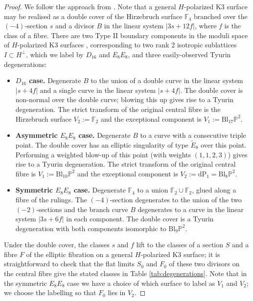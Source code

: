 \documentclass[a4paper]{amsart}
\theoremstyle{definition}
\theoremstyle{plain}
\theoremstyle{remark}
\newcommand{\bF}{\mathbb{F}}
\newcommand{\bP}{\mathbb{P}}
\numberwithin{figure}{section}
\numberwithin{table}{section}
\begin{document}
\begin{proof}
We follow the approach from \cite{t2dk3sd4,jonesthesis}. Note that a general $H$-polarized K3 surface may be realised as a double cover of the Hirzebruch surface $\bF_4$ branched over the $(-4)$-section $s$ and a divisor $B$ in the linear system $|3s + 12f|$, where $f$ is the class of a fibre. There are two Type II boundary components in the moduli space of $H$-polarized K3 surfaces \cite[Section 7F]{cmek3sspt}, corresponding to two rank $2$ isotropic sublattices $I \subset H^{\perp}$, which we label by $D_{16}$ and $E_8E_8$, and three easily-observed Tyurin degenerations:

\begin{itemize}
\item \textbf{$D_{16}$ case.} Degenerate $B$ to the union of a double curve in the linear system $|s+4f|$ and a single curve in the linear system $|s+4f|$. The double cover is non-normal over the double curve; blowing this up gives rise to a Tyurin degeneration. The strict transform of the original central fibre is the Hirzebruch surface $V_2 := \bF_2$ and the exceptional component is $V_1 := \mathrm{Bl}_{17}\bP^2$.

\item \textbf{Asymmetric $E_8E_8$ case.} Degenerate $B$ to a curve with a consecutive triple point. The double cover has an elliptic singularity of type $\widetilde{E}_8$ over this point. Performing a weighted blow-up of this point (with weights $(1,1,2,3)$) gives rise to a Tyurin degeneration. The strict transform of the original central fibre is $V_1:= \mathrm{Bl}_{10}\bP^2$  and the exceptional component is $V_2:= \mathrm{dP}_1 = \mathrm{Bl}_{8}\bP^2$.

\item \textbf{Symmetric $E_8E_8$ case.} Degenerate $\bF_4$ to a union $\bF_2 \cup \bF_2$, glued along a fibre of the rulings. The $(-4)$-section degenerates to the union of the two $(-2)$-sections and the branch curve $B$ degenerates to a curve in the linear system $|3s+6f|$ in each component. The double cover is a Tyurin degeneration with both components isomorphic to  $\mathrm{Bl}_{9}\bP^2$.
\end{itemize}

Under the double cover, the classes $s$ and $f$ lift to the classes of a section $S$ and a fibre $F$ of the elliptic fibration on a general $H$-polarized K3 surface; it is straightforward to check that the flat limits $S_0$ and $F_0$ of these two divisors on the central fibre give the stated classes in Table \ref{tab:degenerations}. Note that in the symmetric $E_8E_8$ case we have a choice of which surface to label as $V_1$ and $V_2$; we choose the labelling so that $F_0$ lies in $V_2$.


\end{proof}
\end{document}

